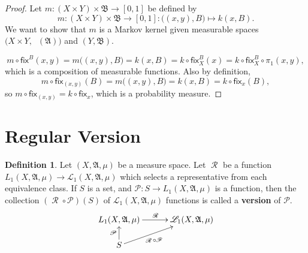 \documentclass[
twoside=true,
paper=letter,
fontsize=9pt,
pagesize=auto,
leqno,
openany,
headsepline,
overfullrule,
]{scrbook}
\theoremstyle{plain}
\theoremstyle{plain}
\theoremstyle{definition}
\theoremstyle{bfnoteitalic}
\theoremstyle{bfnoteroman}
\newtheorem{defnboldnote}[thm]{Definition}
\newcommand{\term}[1]{\textbf{#1}\index{#1}}
\newcommand{\sigalg}[1]{\mathfrak{#1}}
\newcommand{\cali}[1]{\mathscr{#1}}
\newcommand{\sfop}[1]{\mathsf{#1}}
\newcommand{\preimage}[1]{\mathop{#1^{\leftarrow}}}
\newcommand{\sigmaalgebra}{\sigalg{A}}
\newcommand{\sigmaalgebraii}{\sigalg{B}}
\newcommand{\Lone}{L_1(\measurespace, \sigmaalgebra, \measure)}
\newcommand{\caliLone}{\cali{L}_1(\measurespace, \sigmaalgebra, \measure)}
\newcommand{\measurespace}{X}
\newcommand{\measurespaceii}{Y}
\newcommand{\mspaceelt}{x}
\newcommand{\mspaceeltii}{y}
\newcommand{\measure}{\mu}
\newcommand{\setii}{B}
\newcommand{\regular}{\mathop{\cali{R}}}
\newcommand{\projectionone}{\pi_1}
\newcommand{\markovkernel}{k}
\newcommand{\markovkernelii}{m}
\newcommand{\fixinthefirst}[1]{\sfop{fix}_{#1}}
\newcommand{\fixinthesecond}[1]{\sfop{fix}^{#1}}
\begin{document}
\begin{proof}
Let
$\markovkernelii:
(\measurespace\times\measurespaceii) \times \sigmaalgebraii 
\to
[0,1]$
be defined by
\[
\markovkernelii:
(\measurespace\times\measurespaceii) \times \sigmaalgebraii 
\to
[0,1]
: 
\bigl((\mspaceelt,\mspaceeltii),\setii\bigr)\mapsto 
\markovkernel(\mspaceelt,\setii).
\]
We want to show that 
$\markovkernelii$ is a Markov kernel given measurable spaces
$\bigl(\measurespace\times\measurespaceii, \preimage\projectionone(\sigmaalgebra)\bigr)$
and
$(\measurespaceii, \sigmaalgebraii)$.

\[
\markovkernelii\circ
\fixinthesecond{\setii}(\mspaceelt,\mspaceeltii)
=
\markovkernelii\bigl((\mspaceelt,\mspaceeltii),\setii\bigr)
=
\markovkernel(\mspaceelt,\setii)
=
\markovkernel\circ\fixinthesecond{\setii}_\measurespace(\mspaceelt)
=
\markovkernel\circ\fixinthesecond{\setii}_\measurespace\circ\projectionone(\mspaceelt,\mspaceeltii),
\]
which is a composition of measurable functions.
Also by definition,
\[
\markovkernelii\circ\fixinthefirst{(\mspaceelt,\mspaceeltii)}(\setii)
=
\markovkernelii\bigl((\mspaceelt,\mspaceeltii),\setii\bigr)
=
\markovkernel(\mspaceelt,\setii)
=
\markovkernel\circ\fixinthefirst{\mspaceelt}(\setii),
\]
so
$\markovkernelii\circ\fixinthefirst{(\mspaceelt,\mspaceeltii)}
=
\markovkernel\circ\fixinthefirst{\mspaceelt}$, which is a probability measure.
\end{proof}




\section{Regular Version}
\begin{defnboldnote}\label{version}
Let $(\measurespace,\sigmaalgebra,\measure)$ be a measure space.
Let 
$\regular$ be a function $\Lone\to\caliLone$ which selects a representative from each equivalence class.  
If $S$ is a set, and $\cali{P}: S \to \Lone$ is a function, then
the collection $(\regular\circ\cali{P})(S)$ of
$\caliLone$ functions is called a \term{version} of $\cali{P}$.
\[
\xymatrix@R=16pt@C=30pt{ 
\Lone \ar[r]^{\regular} & \caliLone \\
S \ar[ur]_-{\ \regular\circ\cali{F}} \ar[u]^{\cali{P}} & \\
}
\]
\end{defnboldnote}
\end{document}
